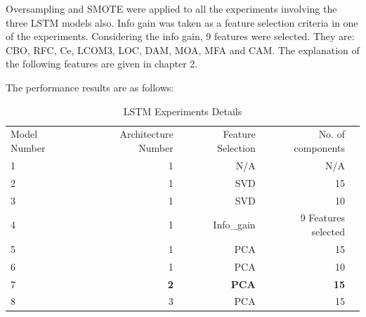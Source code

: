 Oversampling and SMOTE were applied to all the experiments involving the three LSTM models also. Info gain was taken as a feature selection criteria in one of the experiments. Considering the info gain, 9 features were selected. They are: CBO, RFC, Ce, LCOM3, LOC, DAM, MOA, MFA and CAM. The explanation of the following features are given in chapter 2.

The performance results are as follows:

\begin{table}[!htp]\centering
\caption{LSTM Experiments Details}\label{tab: }
\scriptsize
\begin{tabular}{lrrrr}\toprule
Model Number &Architecture Number &Feature Selection &No. of components \\
1 &1 &N/A &N/A \\\midrule
2 &1 &SVD &15 \\
3 &1 &SVD &10 \\
4 &1 &Info\_gain &9 Features selected \\
5 &1 &PCA &15 \\
6 &1 &PCA &10 \\
7 &\textbf{2} &\textbf{PCA} &\textbf{15} \\
8 &3 &PCA &15 \\
\bottomrule
\end{tabular}
\end{table}

